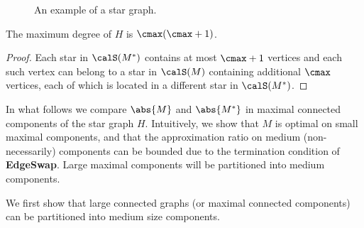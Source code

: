 \begin{figure}
\hspace{3mm}
%
\caption[Carpool - Example of a star graph]{An example of a star graph.}
\label{fig:conflict}
\end{figure}  

\begin{lemma}
The maximum degree of $H$ is $\cmax(\cmax+1)$.
\end{lemma}
\begin{proof}
Each star in $\calS(M^*)$ contains at most $\cmax+1$ vertices and each
such vertex can belong to a star in $\calS(M)$ containing additional
$\cmax$ vertices, each of which is located in a different star in
$\calS(M^*)$.
\end{proof}

In what follows we compare $\abs{M}$ and $\abs{M^*}$ in maximal
connected components of the star graph $H$.  Intuitively, we show that
$M$ is optimal on small maximal components, and that the approximation
ratio on medium (non-necessarily) components can be bounded due to the
termination condition of \textbf{EdgeSwap}.  Large maximal components
will be partitioned into medium components.

We first show that large connected graphs (or maximal connected
components) can be partitioned into medium size components.

